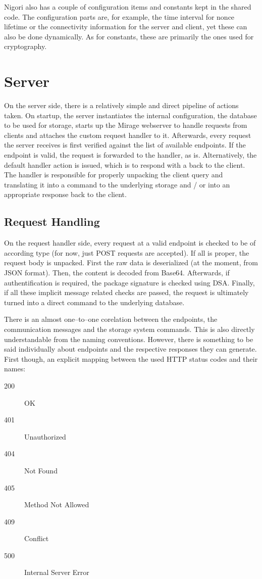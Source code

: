 Nigori also has a couple of configuration items and constants kept in the shared code.
The configuration parts are, for example, the time interval for nonce lifetime or the connectivity information for the server and client, yet these can also be done dynamically.
As for constants, these are primarily the ones used for cryptography.

\section{Server}
On the server side, there is a relatively simple and direct pipeline of actions taken.
On startup, the server instantiates the internal configuration, the database to be used for storage, starts up the Mirage webserver to handle requests from clients and attaches the custom request handler to it.
Afterwards, every request the server receives is first verified against the list of available endpoints.
If the endpoint is valid, the request is forwarded to the handler, as is.
Alternatively, the default handler action is issued, which is to respond with a  back to the client.
The handler is responsible for properly unpacking the client query and translating it into a command to the underlying storage and / or into an appropriate response back to the client.

\subsection{Request Handling}
On the request handler side, every request at a valid endpoint is checked to be of according type (for now, just POST requests are accepted).
If all is proper, the request body is unpacked.
First the raw data is deserialized (at the moment, from JSON format).
Then, the content is decoded from Base64.
Afterwards, if authentification is required, the package signature is checked using DSA.
Finally, if all these implicit message related checks are passed, the request is ultimately turned into a direct command to the underlying database.

There is an almost one--to--one corelation between the endpoints, the communication messages and the storage system commands.
This is also directly understandable from the naming conventions.
However, there is something to be said individually about endpoints and the respective responses they can generate.
First though, an explicit mapping between the used HTTP status codes and their names:
\begin{description}
  \item[200] OK
  \item[401] Unauthorized
  \item[404] Not Found
  \item[405] Method Not Allowed
  \item[409] Conflict
  \item[500] Internal Server Error
\end{description}

